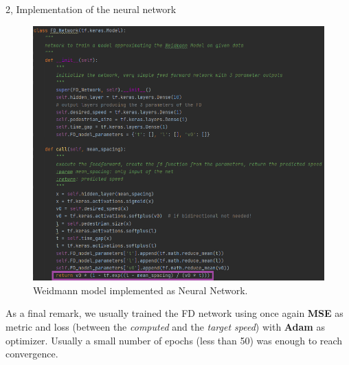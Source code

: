 \documentclass[10pt,a4paper]{article}
\begin{document}
\begin{task}{2, Implementation of the neural network}
\begin{figure}[h]
    \centering
    \includegraphics[scale=0.8]{images/fd_implem.png}
    \caption{Weidmann model implemented as Neural Network.}
    \label{fig:fd-training}
\end{figure}

As a final remark, we usually trained the FD network using once again \textbf{MSE} as metric and loss (between the \textit{computed} and the \textit{target speed}) with \textbf{Adam} as optimizer. Usually a small number of epochs (less than 50) was enough to reach convergence.


\end{task}
\end{document}
